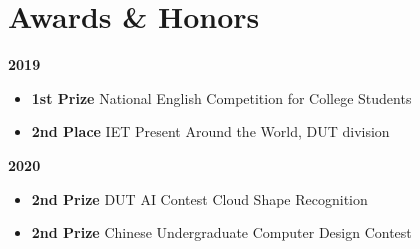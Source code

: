 \documentclass[a4,12pt]{article}
\newcommand{\subtext}[1]{
#1\par\vspace{-0.2cm}}
\newenvironment{zitemize}{
\begin{itemize}\itemsep0pt \parskip0pt \parsep1pt}
{\end{itemize}\vspace{-0.5cm}}
\begin{document}
\section{\textbf{Awards \& Honors}}
\vspace{-0.2cm}
\subtext{\textbf{2019}}
\begin{zitemize}
    \item \textbf{1st Prize} National English Competition for College Students
    \item \textbf{2nd Place} IET Present Around the World, DUT division
\end{zitemize}

\vspace{0.3cm}
\subtext{\textbf{2020}}
\begin{zitemize}
    \item \textbf{2nd Prize} DUT AI Contest Cloud Shape Recognition
    \item \textbf{2nd Prize} Chinese Undergraduate Computer Design Contest
\end{zitemize}


\end{document}
